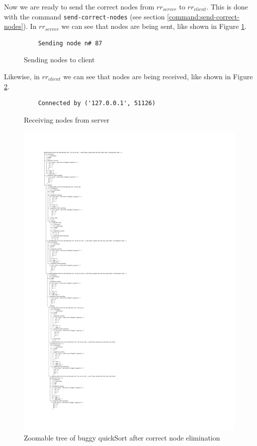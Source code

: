 Now we are ready to send the correct nodes from \(rr_{server}\) to \(rr_{client}\). This is done with the command \verb|send-correct-nodes| (see section \ref{command:send-correct-nodes}).
In \(rr_{server}\) we can see that nodes are being sent, like shown in Figure \ref{fig:sendingNode}.
\begin{figure}[h]
    \centering
    \caption{Sending nodes to client}
    \label{fig:sendingNode}
    \begin{verbatim}
    Sending node n# 87
    \end{verbatim}
\end{figure}
Likewise, in \(rr_{client}\) we can see that nodes are being received, like shown in Figure \ref{fig:receivingNode}.
\begin{figure}[h]
    \centering
    \caption{Receiving nodes from server}
    \label{fig:receivingNode}
    \begin{verbatim}
    Connected by ('127.0.0.1', 51126)
    \end{verbatim}
\end{figure}

\begin{figure}[p]
\centering
    \caption{Zoomable tree of buggy quickSort after correct node elimination}
    \label{fig:buggyTreeAfter}
\includegraphics[width=\textwidth,height=\textheight,keepaspectratio]{Imagenes/Vectorial/buggySwapRemoved.pdf}
\end{figure}

